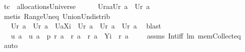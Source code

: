 \begin{isabellebody}
\ {\isacharquery}t{}{\isacharequal}{\isachardoublequoteopen}{\isacharquery}c\ {\isasymin}\ allocationsUniverse{\isachardoublequoteclose}\ \isamarkupfalse%
\ \isanewline
\ \ {}{\isacharcolon}\ {\isachardoublequoteopen}{\isacharquery}U{\isacharparenleft}{\isacharquery}r{\isacharparenleft}{\isacharquery}a{}{\isasymunion}{\isacharquery}a{}{\isacharparenright}{\isacharparenright}{\isacharequal}{\isacharquery}U{\isacharparenleft}{\isacharquery}r\ {\isacharquery}a{}{\isacharparenright}\ {\isasymunion}\ {\isacharparenleft}{\isacharquery}U{\isacharparenleft}{\isacharquery}r\ {\isacharquery}a{}{\isacharparenright}{\isacharparenright}{\isachardoublequoteclose}\ \isamarkupfalse%
\ {\isacharparenleft}metis\ Range{\isacharunderscore}Un{\isacharunderscore}eq\ Union{\isacharunderscore}Un{\isacharunderscore}distrib{\isacharparenright}\ \isamarkupfalse%
\ \isanewline
\ \ {}{\isacharcolon}\ {\isachardoublequoteopen}{\isacharquery}U{\isacharparenleft}{\isacharquery}r\ a{\isacharparenright}\ {\isasymsubseteq}\ {\isacharquery}U{\isacharparenleft}{\isacharquery}r\ {\isacharquery}a{}{\isacharparenright}\ {\isasymunion}\ {\isacharquery}U{\isacharparenleft}a{\isacharbackquote}{\isacharbackquote}{\isacharquery}Xi{\isacharparenright}\ {\isacharampersand}\ {\isacharquery}U{\isacharparenleft}{\isacharquery}r\ {\isacharquery}a{}{\isacharparenright}\ {\isasymunion}\ {\isacharquery}U{\isacharparenleft}{\isacharquery}r\ {\isacharquery}a{}{\isacharparenright}\ {\isasymsubseteq}\ {\isacharquery}U{\isacharparenleft}{\isacharquery}r\ a{\isacharparenright}{\isachardoublequoteclose}\ \isamarkupfalse%
\ blast\ \isamarkupfalse%
\isanewline
\ \ {}{\isacharcolon}\ {\isachardoublequoteopen}{\isacharquery}u\ a\ {\isacharampersand}\ {\isacharquery}u\ {\isacharparenleft}a{\isacharcircum}{\isacharminus}{}{\isacharparenright}\ {\isacharampersand}\ {\isacharquery}p\ {\isacharparenleft}{\isacharquery}r\ a{\isacharparenright}\ {\isacharampersand}\ {\isacharquery}r\ {\isacharquery}a{}\ {\isasymsubseteq}\ {\isacharquery}r\ a\ {\isacharampersand}\ {\isacharquery}Yi\ {\isasymsubseteq}\ {\isacharquery}r\ a{\isachardoublequoteclose}\ \isanewline
\ \ \isamarkupfalse%
\ assms\ Int{\isacharunderscore}iff\ lm{}{}\ mem{\isacharunderscore}Collect{\isacharunderscore}eq\ \isamarkupfalse%
\ auto\ \isamarkupfalse%
\ \isamarkupfalse%

\end{isabellebody}
